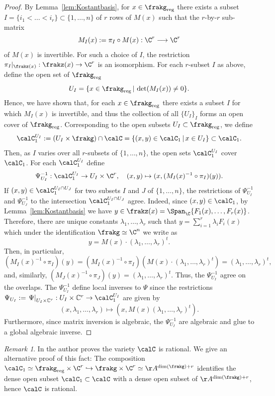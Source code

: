 \documentclass[12pt, a4paper, oneside]{amsart}
\theoremstyle{plain} %
\theoremstyle{definition} %
\theoremstyle{remark} %
\newtheorem{remark}[theorem]{Remark}
\begin{document}
\begin{proof}
By Lemma~\ref{lem:Kostantbasis}, for $x\in \frakg_{\rm reg}$ there exists a subset $I=\{i_1< \dots < i_r\}\subset \{1,\dots, n\}$ of $r$ rows of $M(x)$ such that the $r$-by-$r$ sub-matrix 
\[M_I(x):= \pi_I\circ M(x):\C^r\longrightarrow \C^r\]
of $M(x)$ is invertible. For such a choice of $I$, the restriction $\pi_I|_{\frakz(x)}:\frakz(x)\to \C^r$ is an isomorphism. For each $r$-subset $I$ as above, define the open set of $\frakg_{\rm reg}$
\[U_I=\{x\in \frakg_{\rm reg}\,|\, \det(M_I(x))\neq 0\}.\]  
Hence, we have shown that, for each $x\in \frakg_{\rm reg}$ there exists a subset $I$ for which $M_I(x)$ is invertible, and thus the collection of all $\{U_I\}_{I}$ forms an open cover of $\frakg_{\rm reg}$. Corresponding to the open subsets $U_I\subset \frakg_{\rm reg}$, we define
\[\calC_1^{U_I}:=(U_I\times \frakg)\cap \calC =\{(x,y)\in \calC_1\,|\, x\in U_I\}\subset \calC_1.\]
Then, as $I$ varies over all $r$-subsets of $\{1,\dots, n\}$, the open sets $\calC_1^{U_I}$  cover $\calC_1$. For each $\calC_1^{U_I}$ define 
\[\Psi_{U_I}^{-1}:\calC_1^{U_I}\to U_I\times \C^r,\quad (x,y)\mapsto (x,(M_I(x)^{-1}\circ \pi_I)(y)).\]
If $(x,y)\in \calC_1^{U_I\cap U_J}$ for two subsets $I$ and $J$ of $\{1,\dots, n\}$, the restrictions of $\Psi_{U_I}^{-1}$ and $\Psi_{U_J}^{-1}$ to the intersection $\calC_1^{U_I\cap U_J}$ agree. Indeed, since $(x,y)\in \calC_1$, by Lemma~\ref{lem:Kostantbasis} we have  $y\in \frakz(x)=\Span_{\C}\{F_1(x),\dots, F_r(x)\}$. Therefore, there are unique constants $\lambda_1,\dots,\lambda_r$ such that $y=\sum_{i=1}^r\lambda_iF_i(x)$ which under the identification $\frakg\simeq \C^n$ we write as
\[y = M(x)\cdot(\lambda_1,\dots,\lambda_r)^t.\]
Then, in particular, 
\[(M_I(x)^{-1}\circ \pi_I)(y) = (M_I(x)^{-1}\circ \pi_I)(M(x)\cdot(\lambda_1,\dots,\lambda_r)^t) = (\lambda_1,\dots,\lambda_r)^t,\]
and, similarly, $(M_J(x)^{-1}\circ \pi_J)(y) = (\lambda_1,\dots,\lambda_r)^t$. Thus, the $\Psi_{U_{I}}^{-1}$ agree on the overlaps. The $\Psi_{U_I}^{-1}$ define local inverses to $\Psi$ since the restrictions $\Psi_{U_I}:=
\left.\Psi\right|_{U_I\times\mathbb C^r}:U_I\times\mathbb C^r\to \calC_1^{U_I}$
are given by
\[(x,\lambda_1,\dots,\lambda_r)\longmapsto (x,M(x)(\lambda_1,\dots,\lambda_r)^t).\]
Furthermore, since matrix inversion is algebraic, the $\Psi_{U_I}^{-1}$ are algebraic and glue to a global algebraic inverse. 
\end{proof}

\begin{remark}
In \cite[Theorem 1.12]{Popov} the author proves the variety $\calC$ is rational. We give an alternative proof of this fact: The composition $\calC_1\simeq\frakg_{\rm reg}\times \C^r \hookrightarrow  \frakg\times\C^r \simeq \AA^{\dim(\frakg)+r}$ identifies the dense open subset $\calC_1\subset \calC$ with a dense open subset of $\AA^{\dim(\frakg)+r}$, hence $\calC$ is rational.
\end{remark}
\end{document}
